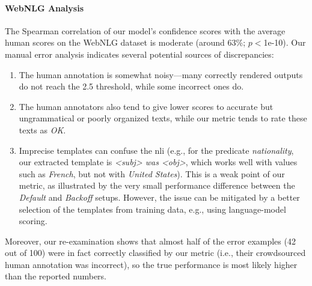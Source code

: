 \paragraph{WebNLG Analysis} The Spearman correlation of our model's confidence scores with the average human scores on the WebNLG dataset is moderate (around 63\%; $p<$1e-10). Our manual error analysis indicates several potential sources of discrepancies:
\begin{enumerate}
    \item The human annotation is somewhat noisy---many correctly rendered outputs do not reach the 2.5 threshold, while some incorrect ones do.
    \item The human annotators also tend to give lower scores to accurate but ungrammatical or poorly organized texts, while our metric tends to rate these texts as \emph{OK}.
    \item Imprecise templates can confuse the \ac{nli} (e.g., for the predicate \emph{nationality}, our extracted template is \emph{\textless{}subj\textgreater{} was \textless{}obj\textgreater{}}, which works well with values such as \emph{French}, but not with \emph{United States}). This is a weak point of our metric, as illustrated by the very small performance difference between the \emph{Default} and \emph{Backoff} setups. However, the issue can be mitigated by a better selection of the templates from training data, e.g., using language-model scoring.
\end{enumerate}

Moreover, our re-examination shows that almost half of the error examples (42 out of 100) were in fact correctly classified by our metric (i.e., their crowdsourced human annotation was incorrect),  so the true performance is most likely higher than the reported numbers.


%







